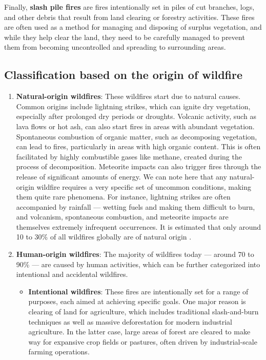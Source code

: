 \documentclass[
  12 pt,
]{Nemilov}
\begin{document}
Finally, \textbf{slash pile fires} are fires intentionally set in piles of cut branches, logs, and other debris that result from land clearing or forestry activities. These fires are often used as a method for managing and disposing of surplus vegetation, and while they help clear the land, they need to be carefully managed to prevent them from becoming uncontrolled and spreading to surrounding areas.

\subsection{Classification based on the origin of wildfire}\label{classification-based-on-the-origin-of-wildfire}

\begin{enumerate}
\def\labelenumi{\arabic{enumi}.}
\item
  \textbf{Natural-origin wildfires}: These wildfires start due to natural causes. Common origins include lightning strikes, which can ignite dry vegetation, especially after prolonged dry periods or droughts. Volcanic activity, such as lava flows or hot ash, can also start fires in areas with abundant vegetation. Spontaneous combustion of organic matter, such as decomposing vegetation, can lead to fires, particularly in areas with high organic content. This is often facilitated by highly combustible gases like methane, created during the process of decomposition. Meteorite impacts can also trigger fires through the release of significant amounts of energy. We can note here that any natural-origin wildfire requires a very specific set of uncommon conditions, making them quite rare phenomena. For instance, lightning strikes are often accompanied by rainfall --- wetting fuels and making them difficult to burn, and volcanism, spontaneous combustion, and meteorite impacts are themselves extremely infrequent occurrences. It is estimated that only around 10 to 30\% of all wildfires globally are of natural origin \citep{robinne2021impacts}.
\item
  \textbf{Human-origin wildfires}: The majority of wildfires today --- around 70 to 90\% \citep{robinne2021impacts} --- are caused by human activities, which can be further categorized into intentional and accidental wildfires.

  \begin{itemize}
  \item
    \textbf{Intentional wildfires}: These fires are intentionally set for a range of purposes, each aimed at achieving specific goals. One major reason is clearing of land for agriculture, which includes traditional slash-and-burn techniques as well as massive deforestation for modern industrial agriculture. In the latter case, large areas of forest are cleared to make way for expansive crop fields or pastures, often driven by industrial-scale farming operations.


\end{itemize}
\end{enumerate}
\end{document}
